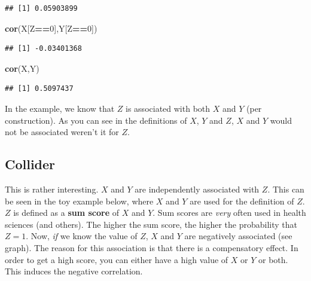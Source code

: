 \documentclass[
]{book}
\newenvironment{Shaded}{\begin{snugshade}}{\end{snugshade}}
\newcommand{\DecValTok}[1]{\textcolor[rgb]{0.00,0.00,0.81}{#1}}
\newcommand{\FunctionTok}[1]{\textcolor[rgb]{0.13,0.29,0.53}{\textbf{#1}}}
\newcommand{\NormalTok}[1]{#1}
\newcommand{\SpecialCharTok}[1]{\textcolor[rgb]{0.81,0.36,0.00}{\textbf{#1}}}
\begin{document}
\begin{verbatim}
## [1] 0.05903899
\end{verbatim}

\begin{Shaded}
\begin{Highlighting}[]
\FunctionTok{cor}\NormalTok{(X[Z}\SpecialCharTok{==}\DecValTok{0}\NormalTok{],Y[Z}\SpecialCharTok{==}\DecValTok{0}\NormalTok{])}
\end{Highlighting}
\end{Shaded}

\begin{verbatim}
## [1] -0.03401368
\end{verbatim}

\begin{Shaded}
\begin{Highlighting}[]
\FunctionTok{cor}\NormalTok{(X,Y)}
\end{Highlighting}
\end{Shaded}

\begin{verbatim}
## [1] 0.5097437
\end{verbatim}

In the example, we know that \(Z\) is associated with both \(X\) and \(Y\) (per construction).
As you can see in the definitions of \(X\), \(Y\) and \(Z\), \(X\) and \(Y\) would not be associated
weren't it for \(Z\).

\subsection{Collider}\label{collider}

This is rather interesting. \(X\) and \(Y\) are independently associated
with \(Z\). This can be seen in the toy example below, where \(X\) and \(Y\) are used
for the definition of \(Z\). \(Z\) is defined as a \textbf{sum
score} of \(X\) and \(Y\). Sum scores are \emph{very} often used in health sciences (and others).
The higher the sum score, the higher the probability that \(Z=1\).
Now, \emph{if} we know the value of \(Z\), \(X\) and \(Y\) are negatively associated (see graph).
The reason for this association is that there is a compensatory effect. In order to get a high
score, you can either have a high value of \(X\) or \(Y\) or both.
This induces the negative correlation.
\end{document}
